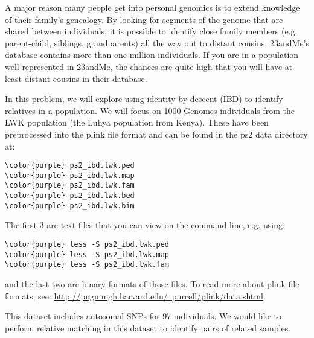 \documentclass[12pt]{article}
\begin{document}
A major reason many people get into personal genomics is to extend knowledge of their family's genealogy. By looking for segments of the genome that are shared between individuals, it is possible to identify close family members (e.g. parent-child, siblings, grandparents) all the way out to distant cousins. 23andMe's database contains more than one million individuals. If you are in a population well represented in 23andMe, the chances are quite high that you will have at least distant cousins in their database.

In this problem, we will explore using identity-by-descent (IBD) to identify relatives in a population. We will focus on 1000 Genomes individuals from the LWK population (the Luhya population from Kenya). These have been preprocessed into the plink file format and can be found in the ps2 data directory at:

\begin{Verbatim}[commandchars=\\\{\}]
\color{purple} ps2_ibd.lwk.ped
\color{purple} ps2_ibd.lwk.map
\color{purple} ps2_ibd.lwk.fam
\color{purple} ps2_ibd.lwk.bed
\color{purple} ps2_ibd.lwk.bim
\end{Verbatim}

The first 3 are text files that you can view on the command line, e.g. using:
\begin{Verbatim}[commandchars=\\\{\}]
\color{purple} less -S ps2_ibd.lwk.ped
\color{purple} less -S ps2_ibd.lwk.map
\color{purple} less -S ps2_ibd.lwk.fam
\end{Verbatim}

and the last two are binary formats of those files. To read more about plink file formats, see: \href{http://pngu.mgh.harvard.edu/~purcell/plink/data.shtml}{http://pngu.mgh.harvard.edu/~purcell/plink/data.shtml}.

This dataset includes autosomal SNPs for 97 individuals. We would like to perform relative matching in this dataset to identify pairs of related samples.
\end{document}

